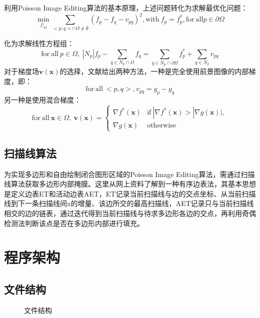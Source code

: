 \documentclass[14pt]{scrartcl} %
\begin{document}
	利用Poisson Image Editing算法的基本原理，上述问题转化为求解最优化问题：
	\begin{equation}
		\min\limits_{f|_\Omega}\sum\limits_{<p,q>\cap \Omega\neq \emptyset}(f_p-f_q-v_{pq})^2,\mathrm{with}\ f_p=f_p^*,\mathrm{for}\ \mathrm{all}p\in \partial\Omega
	\end{equation}
	
	化为求解线性方程组：
	\begin{equation}
		\mathrm{for}\ \mathrm{all}\ p\in \Omega,\ |N_p|f_p-\sum\limits_{q\in N_p\cap \Omega} f_q=\sum\limits_{q\in N_p\cap \partial \Omega}f_p^*+\sum\limits_{q\in N_p}v_{pq}
	\end{equation}
	对于梯度场$\boldsymbol{v}(\boldsymbol{x})$的选择，文献\cite{perez2003poisson}给出两种方法，一种是完全使用前景图像的内部梯度，即：
	\begin{equation}
		\mathrm{for}\ \mathrm{all}\ <p,q>,v_{pq}=g_p-g_q
	\end{equation}
	另一种是使用混合梯度：
	\begin{equation}
		\mathrm{for}\ \mathrm{all}\ \boldsymbol{x}\in \Omega,\ \boldsymbol{v}(\boldsymbol{x})=\begin{cases}
			\nabla f^*(\boldsymbol{x})&\mathrm{if}\ |\nabla f^*(\boldsymbol{x})>|\nabla g(\boldsymbol{x})|,\\
			\nabla g(\boldsymbol{x})&\mathrm{otherwise}
		\end{cases} 
	\end{equation}
	
	\subsection{扫描线算法}
	为实现多边形和自由绘制闭合图形区域的Poisson Image Editing算法，需通过扫描线算法获取多边形内部掩膜。这里从网上资料了解到一种有序边表法，其基本思想是定义边表ET和活动边表AET，ET记录当前扫描线与边的交点坐标、从当前扫描线到下一条扫描线间x的增量、该边所交的最高扫描线，AET记录只与当前扫描线相交的边的链表，通过迭代得到当前扫描线与待求多边形各边的交点，再利用奇偶检测法判断该点是否在多边形内部进行填充。
	
	
	\pagebreak
	\section{程序架构}
	\subsection{文件结构}
	\begin{figure}[h] %
		\centering
		\caption{文件结构}
	\end{figure}
	
\end{document}
